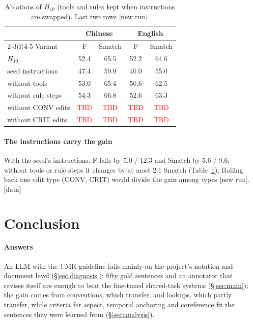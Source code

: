 \documentclass[11pt]{article}
\newcommand{\stag}[2]{\textcolor{#1}{\textsf{\scriptsize[#2]}}}
\newcommand{\HAVE}{\stag{green!50!black}{data}\xspace}
\newcommand{\RUN}{\stag{red!75!black}{new run}\xspace}
\newcommand{\tbd}{\textcolor{red}{TBD}\xspace}
\begin{document}
\begin{table}[t]
\centering\small
\setlength{\tabcolsep}{3.5pt}
\begin{tabular}{@{}lcccc@{}}
\toprule
& \multicolumn{2}{c}{Chinese} & \multicolumn{2}{c}{English} \\
\cmidrule(lr){2-3}\cmidrule(l){4-5}
Variant & F & Smatch & F & Smatch \\
\midrule
$H_{10}$ & 52.4 & 65.5 & 52.2 & 64.6 \\
seed instructions & 47.4 & 59.9 & 40.0 & 55.0 \\
without tools & 53.0 & 65.4 & 50.6 & 62.5 \\
without rule steps & 54.3 & 66.8 & 52.6 & 63.3 \\
without CONV edits & \tbd & \tbd & \tbd & \tbd \\
without CRIT edits & \tbd & \tbd & \tbd & \tbd \\
\bottomrule
\end{tabular}
\caption{Ablations of $H_{10}$ (tools and rules kept when instructions are swapped). Last two rows \RUN.}
\label{tab:ablation}
\end{table}

\paragraph{The instructions carry the gain}
With the seed's instructions, F falls by 5.0 / 12.3 and Smatch by 5.6 / 9.6; without tools or rule steps it changes by at most 2.1 Smatch (Table~\ref{tab:ablation}). Rolling back one edit type (CONV, CRIT) would divide the gain among types \RUN. \HAVE

\section{Conclusion}
\label{sec:conclusion}

\paragraph{Answers}
An LLM with the UMR guideline fails mainly on the project's notation and document level (\S\ref{sec:diagnosis}); fifty gold sentences and an annotator that revises itself are enough to beat the fine-tuned shared-task systems (\S\ref{sec:main}); the gain comes from conventions, which transfer, and lookups, which partly transfer, while criteria for aspect, temporal anchoring and coreference fit the sentences they were learned from (\S\ref{sec:analysis}).
\end{document}
